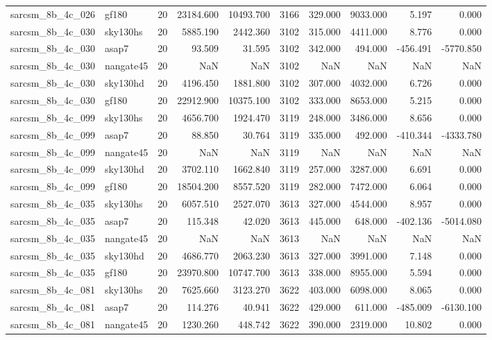 \documentclass{article}
\begin{document}
\begin{longtable}{llrrrrrrrr}
sarcsm\_8b\_4c\_026 & gf180 & 20 & 23184.600 & 10493.700 & 3166 & 329.000 & 9033.000 & 5.197 & 0.000 \\
sarcsm\_8b\_4c\_030 & sky130hs & 20 & 5885.190 & 2442.360 & 3102 & 315.000 & 4411.000 & 8.776 & 0.000 \\
sarcsm\_8b\_4c\_030 & asap7 & 20 & 93.509 & 31.595 & 3102 & 342.000 & 494.000 & -456.491 & -5770.850 \\
sarcsm\_8b\_4c\_030 & nangate45 & 20 & NaN & NaN & 3102 & NaN & NaN & NaN & NaN \\
sarcsm\_8b\_4c\_030 & sky130hd & 20 & 4196.450 & 1881.800 & 3102 & 307.000 & 4032.000 & 6.726 & 0.000 \\
sarcsm\_8b\_4c\_030 & gf180 & 20 & 22912.900 & 10375.100 & 3102 & 333.000 & 8653.000 & 5.215 & 0.000 \\
sarcsm\_8b\_4c\_099 & sky130hs & 20 & 4656.700 & 1924.470 & 3119 & 248.000 & 3486.000 & 8.656 & 0.000 \\
sarcsm\_8b\_4c\_099 & asap7 & 20 & 88.850 & 30.764 & 3119 & 335.000 & 492.000 & -410.344 & -4333.780 \\
sarcsm\_8b\_4c\_099 & nangate45 & 20 & NaN & NaN & 3119 & NaN & NaN & NaN & NaN \\
sarcsm\_8b\_4c\_099 & sky130hd & 20 & 3702.110 & 1662.840 & 3119 & 257.000 & 3287.000 & 6.691 & 0.000 \\
sarcsm\_8b\_4c\_099 & gf180 & 20 & 18504.200 & 8557.520 & 3119 & 282.000 & 7472.000 & 6.064 & 0.000 \\
sarcsm\_8b\_4c\_035 & sky130hs & 20 & 6057.510 & 2527.070 & 3613 & 327.000 & 4544.000 & 8.957 & 0.000 \\
sarcsm\_8b\_4c\_035 & asap7 & 20 & 115.348 & 42.020 & 3613 & 445.000 & 648.000 & -402.136 & -5014.080 \\
sarcsm\_8b\_4c\_035 & nangate45 & 20 & NaN & NaN & 3613 & NaN & NaN & NaN & NaN \\
sarcsm\_8b\_4c\_035 & sky130hd & 20 & 4686.770 & 2063.230 & 3613 & 327.000 & 3991.000 & 7.148 & 0.000 \\
sarcsm\_8b\_4c\_035 & gf180 & 20 & 23970.800 & 10747.700 & 3613 & 338.000 & 8955.000 & 5.594 & 0.000 \\
sarcsm\_8b\_4c\_081 & sky130hs & 20 & 7625.660 & 3123.270 & 3622 & 403.000 & 6098.000 & 8.065 & 0.000 \\
sarcsm\_8b\_4c\_081 & asap7 & 20 & 114.276 & 40.941 & 3622 & 429.000 & 611.000 & -485.009 & -6130.100 \\
sarcsm\_8b\_4c\_081 & nangate45 & 20 & 1230.260 & 448.742 & 3622 & 390.000 & 2319.000 & 10.802 & 0.000 \\

\end{longtable}
\end{document}
